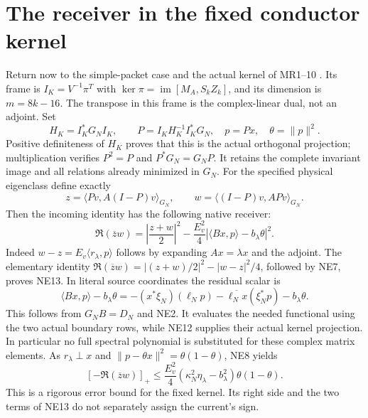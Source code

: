 \documentclass[11pt]{article}
\newcommand{\norm}[1]{\lVert#1\rVert}
\begin{document}
\section{The receiver in the fixed conductor kernel}
Return now to the simple-packet case and the actual kernel of MR1--10
\cite{MR}. Its frame is $I_K=V^{-1}\pi^T$ with
$\ker\pi=\operatorname{im}[M_A,S_kZ_k]$, and its dimension is
$m=8k-16$. The transpose in this frame is the complex-linear dual,
not an adjoint. Set
\begin{equation}\tag{NE12}
H_K=I_K^*G_NI_K,\qquad P=I_KH_K^{-1}I_K^*G_N,
\quad p=Px,\quad\theta=\norm p^2.
\end{equation}
Positive definiteness of $H_K$ proves that this is the actual
orthogonal projection; multiplication verifies $P^2=P$ and
$P^*G_N=G_NP$. It retains the complete invariant image and all
relations already minimized in $G_N$.
For the specified physical eigenclass define exactly
\[
z=\langle Pv,A(I-P)v\rangle_{G_N},\qquad
w=\langle(I-P)v,APv\rangle_{G_N}.
\]
Then the incoming identity has the following native receiver:
\begin{equation}\tag{NE13}
\boxed{\Re(\overline zw)=\left|\frac{z+w}{2}\right|^2
-\frac{E_v^2}{4}\left|\langle Bx,p\rangle-b_\lambda\theta\right|^2.}
\end{equation}
Indeed $w-z=E_v\langle r_\lambda,p\rangle$ follows by expanding
$Ax=\lambda x$ and the adjoint. The elementary identity
$\Re(\overline zw)=|(z+w)/2|^2-|w-z|^2/4$, followed by NE7,
proves NE13. In literal source coordinates the residual scalar is
\begin{equation}\tag{NE14}
\langle Bx,p\rangle-b_\lambda\theta
=-(x^*\xi_N)(\ell_Np)
-\overline{\ell_Nx}(\xi_N^*p)-b_\lambda\theta.
\end{equation}
This follows from $G_NB=D_N$ and NE2. It evaluates the needed
functional using the two actual boundary rows, while NE12 supplies
their actual kernel projection. In particular no full spectral
polynomial is substituted for these complex matrix elements.
As $r_\lambda\perp x$ and
$\norm{p-\theta x}^2=\theta(1-\theta)$, NE8 yields
\begin{equation}\tag{NE15}
[-\Re(\overline zw)]_+
\le\frac{E_v^2}{4}
(\kappa_N^2\eta_\lambda-b_\lambda^2)\theta(1-\theta).
\end{equation}
This is a rigorous error bound for the fixed kernel. Its right side
and the two terms of NE13 do not separately assign the current's sign.
\end{document}
